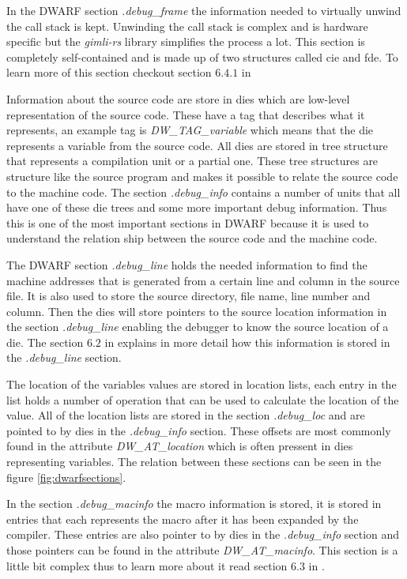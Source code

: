 In the \gls{DWARF} section \emph{.debug\_frame} the information needed to virtually unwind the call stack is kept.
Unwinding the call stack is complex and is hardware specific but the \emph{gimli-rs} library simplifies the process a lot.
This section is completely self-contained and is made up of two structures called \acrfull{cie} and \acrfull{fde}.
To learn more of this section checkout section $6.4.1$ in \cite{dwarf}


Information about the source code are store in \glspl{die} which are low-level representation of the source code.
These have a tag that describes what it represents, an example tag is \emph{DW\_TAG\_variable} which means that the \gls{die} represents a variable from the source code.
All \glspl{die} are stored in \gls{tree} structure that represents a compilation unit or a partial one.
These \gls{tree} structures are structure like the source program and makes it possible to relate the source code to the machine code.
The section \emph{.debug\_info} contains a number of units that all have one of these \gls{die} \glspl{tree} and some more important debug information.
Thus this is one of the most important sections in \gls{DWARF} because it is used to understand the relation ship between the source code and the machine code.


The \gls{DWARF} section \emph{.debug\_line} holds the needed information to find the machine addresses that is generated from a certain line and column in the source file.
It is also used to store the source directory, file name, line number and column.
Then the \glspl{die} will store pointers to the source location information in the section \emph{.debug\_line} enabling the debugger to know the source location of a \gls{die}.
The section $6.2$ in \cite{dwarf} explains in more detail how this information is stored in the \emph{.debug\_line} section.


The location of the variables values are stored in location lists, each entry in the list holds a number of operation that can be used to calculate the location of the value.
All of the location lists are stored in the section \emph{.debug\_loc} and are pointed to by \glspl{die} in the \emph{.debug\_info} section.
These offsets are most commonly found in the attribute \emph{DW\_AT\_location} which is often pressent in \glspl{die} representing variables.
The relation between these sections can be seen in the figure \ref{fig:dwarfsections}.


In the section \emph{.debug\_macinfo} the macro information is stored, it is stored in entries that each represents the macro after it has been expanded by the compiler.
These entries are also pointer to by \glspl{die} in the \emph{.debug\_info} section and those pointers can be found in the attribute \emph{DW\_AT\_macinfo}.
This section is a little bit complex thus to learn more about it read section $6.3$ in \cite{dwarf}.


